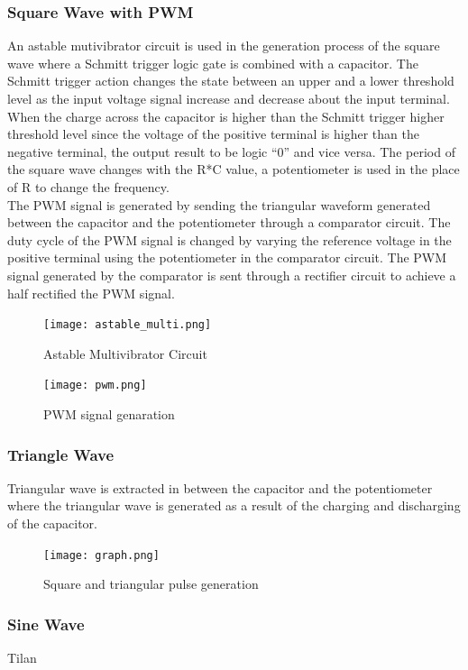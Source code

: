 \documentclass[11pt]{article}
\begin{document}
\begin{multicols}{2}
\subsubsection{Square Wave with PWM}
An astable mutivibrator circuit is used in the generation process of the square wave where a Schmitt trigger logic gate is combined with a capacitor. The Schmitt trigger action changes the state between an upper and a lower threshold level as the input voltage signal increase and decrease about the input terminal. When the charge across the capacitor is higher than the Schmitt trigger higher threshold level since the voltage of the positive terminal is higher than the negative terminal, the output result to be logic “0” and vice versa. The period of the square wave changes with the R*C value, a potentiometer is used in the place of R to change the frequency. \\ The PWM signal is generated by sending the triangular waveform generated between the capacitor and the potentiometer through a comparator circuit. The duty cycle of the PWM signal is changed by varying the reference voltage in the positive terminal using the potentiometer in the comparator circuit. The PWM signal generated by the comparator  is sent through a rectifier circuit to achieve a half rectified the PWM signal.
\begin{figure}[H]
    \centering
    \texttt{[image: astable\_multi.png]}
    \caption{Astable Multivibrator Circuit}
    \label{fig:mesh1}
\end{figure}
\begin{figure}[H]
    \centering
    \texttt{[image: pwm.png]}
    \caption{PWM signal genaration}
    \label{fig:mesh1}
\end{figure}
\subsubsection{Triangle Wave}
Triangular wave is extracted in between the capacitor and the potentiometer where the triangular wave is generated as a result of the charging and discharging of the capacitor.
\begin{figure}[H]
    \centering
    \texttt{[image: graph.png]}
    \caption{Square and triangular pulse generation}
    \label{fig:mesh1}
\end{figure}

\subsubsection{Sine Wave}
Tilan

\end{multicols}
\end{document}
